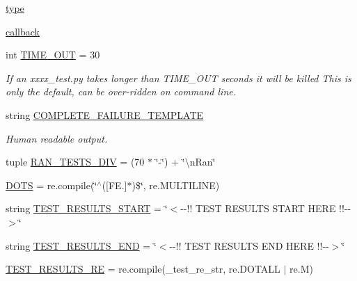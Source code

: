 \begin{DoxyCompactItemize}
\item 
\hyperlink{namespacepygame_1_1tests_1_1test__utils_1_1test__runner_a9df93b0979dda9fa7f42abaa9e2052f4}{type}
\item 
\hyperlink{namespacepygame_1_1tests_1_1test__utils_1_1test__runner_a881a3e9905ba2f13c5bf52a7d1336e20}{callback}
\item 
int \hyperlink{namespacepygame_1_1tests_1_1test__utils_1_1test__runner_ae0aa2beb01951d6be214be077e21828b}{T\+I\+M\+E\+\_\+\+O\+UT} = 30
\begin{DoxyCompactList}\small\item\em If an xxxx\+\_\+test.\+py takes longer than T\+I\+M\+E\+\_\+\+O\+UT seconds it will be killed This is only the default, can be over-\/ridden on command line. \end{DoxyCompactList}\item 
string \hyperlink{namespacepygame_1_1tests_1_1test__utils_1_1test__runner_a7616f338f52ad3c9287a2fdfb259656d}{C\+O\+M\+P\+L\+E\+T\+E\+\_\+\+F\+A\+I\+L\+U\+R\+E\+\_\+\+T\+E\+M\+P\+L\+A\+TE}
\begin{DoxyCompactList}\small\item\em Human readable output. \end{DoxyCompactList}\item 
tuple \hyperlink{namespacepygame_1_1tests_1_1test__utils_1_1test__runner_add422730327ec974fc90e5a95401edb3}{R\+A\+N\+\_\+\+T\+E\+S\+T\+S\+\_\+\+D\+IV} = (70 $\ast$ \char`\"{}-\/\char`\"{}) + \char`\"{}\textbackslash{}n\+Ran\char`\"{}
\item 
\hyperlink{namespacepygame_1_1tests_1_1test__utils_1_1test__runner_aae16f893e418cffca9c38850c877e0fe}{D\+O\+TS} = re.\+compile(\char`\"{}$^\wedge$(\mbox{[}F\+E.\mbox{]}$\ast$)\$\char`\"{}, re.\+M\+U\+L\+T\+I\+L\+I\+NE)
\item 
string \hyperlink{namespacepygame_1_1tests_1_1test__utils_1_1test__runner_a686d6f06078c62dfaaf43b182ebae734}{T\+E\+S\+T\+\_\+\+R\+E\+S\+U\+L\+T\+S\+\_\+\+S\+T\+A\+RT} = \char`\"{}$<$-\/-\/!! T\+E\+ST R\+E\+S\+U\+L\+TS S\+T\+A\+RT H\+E\+RE !!-\/-\/$>$\char`\"{}
\item 
string \hyperlink{namespacepygame_1_1tests_1_1test__utils_1_1test__runner_a57320713144abd91d672d83829eed7ef}{T\+E\+S\+T\+\_\+\+R\+E\+S\+U\+L\+T\+S\+\_\+\+E\+ND} = \char`\"{}$<$-\/-\/!! T\+E\+ST R\+E\+S\+U\+L\+TS E\+ND H\+E\+RE !!-\/-\/$>$\char`\"{}
\item 
\hyperlink{namespacepygame_1_1tests_1_1test__utils_1_1test__runner_a6e2c85b5f83f0dc7f28f67283a902448}{T\+E\+S\+T\+\_\+\+R\+E\+S\+U\+L\+T\+S\+\_\+\+RE} = re.\+compile(\+\_\+test\+\_\+re\+\_\+str, re.\+D\+O\+T\+A\+LL $\vert$ re.\+M)

\end{DoxyCompactItemize}

